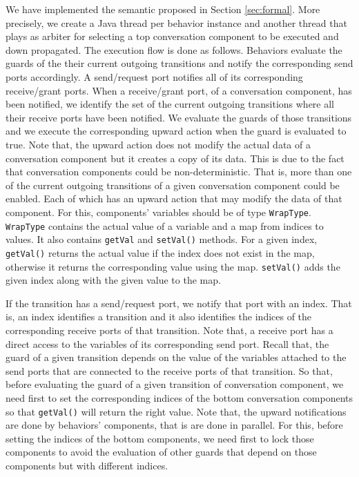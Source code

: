 We have implemented the semantic proposed in Section \ref{sec:formal}. More precisely, we create a Java thread per behavior instance and another thread that plays as arbiter for selecting a top conversation component to be executed and down propagated. The execution flow is done as follows. Behaviors evaluate the guards of the their current outgoing transitions and notify the corresponding send ports accordingly. A send/request port notifies all of its corresponding receive/grant ports. When a receive/grant port, of a conversation component, has been notified, we identify the set of the current outgoing transitions where all their receive ports have been notified. We evaluate the guards of those transitions and we execute the corresponding upward action when the guard is evaluated to true. Note that, the upward action does not modify the actual data of a conversation component but it creates a copy of its data. This is due to the fact that conversation components could be non-deterministic. That is, more than one of the current outgoing transitions of a given conversation component could be enabled. Each of which has an upward action that may modify the data of that component. For this, components' variables should be of type \texttt{WrapType}. \texttt{WrapType} contains the actual value of a variable and a map from indices to values. It also contains \texttt{getVal} and \texttt{setVal()} methods. 
For a given index, \texttt{getVal()} returns the actual value if the index does not exist in the map, otherwise it returns the corresponding value using the map. \texttt{setVal()} adds the given index along with the given value to the map. 

If the transition has a send/request port, we notify that port with an index. That is, an index identifies a transition and it also identifies the indices of the corresponding receive ports of that transition. 
Note that, a receive port has a direct access to the variables of its corresponding send port. Recall that, the guard of a given transition depends on the value of the variables attached to the send ports that are connected to the receive ports of that transition. So that, before evaluating the guard of a given transition of conversation component, we need first to set the corresponding indices of the bottom conversation components so that \texttt{getVal()} will return the right value. Note that, the upward notifications are done by behaviors' components, that is are done in parallel. For this, before setting the indices of the bottom components, we need first to lock those components to avoid the evaluation of other guards that depend on those components but with different indices. 

